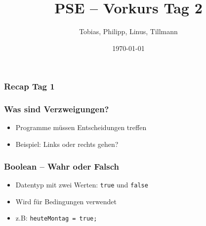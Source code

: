 \documentclass{../../presentation}
\title{PSE – Vorkurs Tag 2}
\author{Tobias, Philipp, Linus, Tillmann}
\institute{FIUS - Fachgruppe Informatik Universität Stuttgart}
\date{\today}
\begin{document}
\begin{frame}
  \titlepage
\end{frame}

\begin{frame}
  \listoftodos
\end{frame}

\begin{frame}
  \frametitle{Recap Tag 1}
\end{frame}

\begin{frame}
  \frametitle{Was sind Verzweigungen?}
  \begin{itemize}
    \item Programme müssen Entscheidungen treffen 
    \item Beispiel: Links oder rechts gehen?
  \end{itemize}
\end{frame}

\begin{frame}
  \frametitle{Boolean – Wahr oder Falsch}
  \begin{itemize}
    \item Datentyp mit zwei Werten: \texttt{true} und \texttt{false}
    \item Wird für Bedingungen verwendet
    \item z.B: \texttt{heuteMontag = true;}

    
  \end{itemize}
\end{frame}
\end{document}

